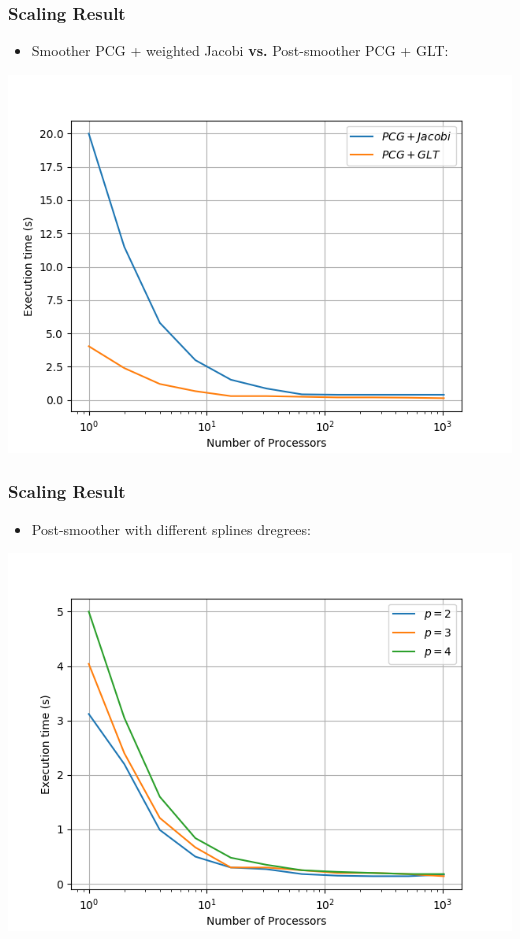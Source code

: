\begin{frame}
\frametitle{Scaling	Result}
\begin{itemize}
\item Smoother PCG + weighted Jacobi \textbf{vs.} Post-smoother PCG + GLT:
\end{itemize}
  \begin{center}
    \includegraphics[angle=0,width=0.9\hsize]{figures/post1}
  \end{center}
\end{frame}

\begin{frame}
\frametitle{Scaling	Result}
\begin{itemize}
\item Post-smoother with different splines dregrees:
\end{itemize}
  \begin{center}
    \includegraphics[angle=0,width=0.9\hsize]{figures/post2}
  \end{center}
\end{frame}

